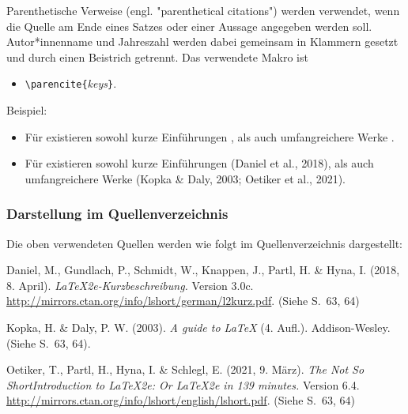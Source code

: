 Parenthetische Verweise (engl. "parenthetical citations") werden verwendet,
wenn die Quelle am Ende eines Satzes oder einer Aussage angegeben werden soll.
Autor*innen\-name und Jahreszahl werden dabei gemeinsam in Klammern gesetzt
und durch einen Beistrich getrennt. Das verwendete Makro ist
%
\begin{itemize}
    \item[] \verb!\parencite{!\textit{keys}\verb!}!.
\end{itemize}
%
Beispiel:
%
\begin{itemize}
\item[]
\begin{LaTeXCode}[numbers=none,breakindent=0pt]
Für \latex existieren sowohl kurze Einführungen \parencite{Daniel2018}, als
auch umfangreichere Werke \parencite{Oetiker2021, Kopka2003}.
\end{LaTeXCode}
%
\item[]
    Für \latex existieren sowohl kurze Einführungen (Daniel et al., 2018),
    als auch umfangreichere Werke (Kopka \& Daly, 2003; Oetiker et al., 2021).
\end{itemize}


\subsubsection{Darstellung im Quellenverzeichnis}

\begin{sloppypar}
Die oben verwendeten Quellen werden wie folgt im Quellenverzeichnis dargestellt:
%
\begin{list}{}{
\setlength{\leftmargin}{1.3cm}
\setlength{\itemindent}{-1.3cm}
\setlength{\itemsep}{-0.15cm}
}
\item
Daniel, M., Gundlach, P., Schmidt, W., Knappen, J., Partl, H. \& Hyna, I.
(2018, 8. April).
\textit{\LaTeX2e-Kurzbeschreibung.} Version 3.0c.
\textrm{\url{http://mirrors.ctan.org/info/lshort/german/l2kurz.pdf}}.
(Siehe S.\ 63, 64)
\item
Kopka, H. \& Daly, P. W. (2003). \textit{A guide to \LaTeX} (4. Aufl.).
Addison-Wesley. (Siehe S.\ 63, 64).
\item
Oetiker, T., Partl, H., Hyna, I. \& Schlegl, E. (2021, 9. März). \textit{The
Not So ShortIntroduction to \LaTeX2e: Or \LaTeX2e in 139 minutes.} Version 6.4.
\url{http://mirrors.ctan.org/info/lshort/english/lshort.pdf}. (Siehe S.\
63, 64)
\end{list}
\end{sloppypar}


